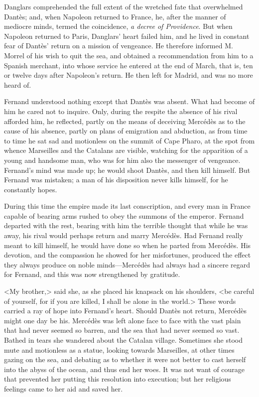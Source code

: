  Danglars comprehended the full extent of the wretched fate that overwhelmed Dantès; and, when Napoleon returned to France, he, after the manner of mediocre minds, termed the coincidence, \textit{a decree of Providence}. But when Napoleon returned to Paris, Danglars' heart failed him, and he lived in constant fear of Dantès' return on a mission of vengeance. He therefore informed M. Morrel of his wish to quit the sea, and obtained a recommendation from him to a Spanish merchant, into whose service he entered at the end of March, that is, ten or twelve days after Napoleon's return. He then left for Madrid, and was no more heard of. 

 Fernand understood nothing except that Dantès was absent. What had become of him he cared not to inquire. Only, during the respite the absence of his rival afforded him, he reflected, partly on the means of deceiving Mercédès as to the cause of his absence, partly on plans of emigration and abduction, as from time to time he sat sad and motionless on the summit of Cape Pharo, at the spot from whence Marseilles and the Catalans are visible, watching for the apparition of a young and handsome man, who was for him also the messenger of vengeance. Fernand's mind was made up; he would shoot Dantès, and then kill himself. But Fernand was mistaken; a man of his disposition never kills himself, for he constantly hopes. 

 During this time the empire made its last conscription, and every man in France capable of bearing arms rushed to obey the summons of the emperor. Fernand departed with the rest, bearing with him the terrible thought that while he was away, his rival would perhaps return and marry Mercédès. Had Fernand really meant to kill himself, he would have done so when he parted from Mercédès. His devotion, and the compassion he showed for her misfortunes, produced the effect they always produce on noble minds—Mercédès had always had a sincere regard for Fernand, and this was now strengthened by gratitude. 

 <My brother,> said she, as she placed his knapsack on his shoulders, <be careful of yourself, for if you are killed, I shall be alone in the world.> These words carried a ray of hope into Fernand's heart. Should Dantès not return, Mercédès might one day be his.  Mercédès was left alone face to face with the vast plain that had never seemed so barren, and the sea that had never seemed so vast. Bathed in tears she wandered about the Catalan village. Sometimes she stood mute and motionless as a statue, looking towards Marseilles, at other times gazing on the sea, and debating as to whether it were not better to cast herself into the abyss of the ocean, and thus end her woes. It was not want of courage that prevented her putting this resolution into execution; but her religious feelings came to her aid and saved her. 

